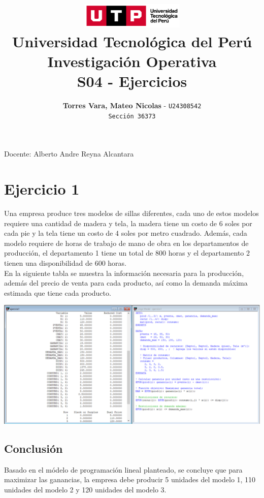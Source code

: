\documentclass[12pt]{article}
\title{
  \vspace{2cm}
  \pagenumbering{gobble}
  \includegraphics[width=5cm]{../assets/logo-utp.png} \\
  \vspace{1cm}
  \textbf{Universidad Tecnológica del Perú} \\
  \vspace{2cm}
  \textbf{Investigación Operativa} \\
  \vspace{1cm}
  \large \textbf{S04 - Ejercicios}
}
\author{
  \textbf{Torres Vara, Mateo Nicolas} - \texttt{U24308542} \\
  \texttt{Sección 36373}
}
\begin{document}
\maketitle
\begin{center}

  Docente: Alberto Andre Reyna Alcantara

\end{center}

%
%

\newpage
\section*{Ejercicio 1}
\noindent Una empresa produce tres modelos de sillas diferentes, cada uno de estos modelos requiere una cantidad de madera y tela, la madera tiene un costo de 6 soles por cada pie y la tela tiene un costo de 4 soles por metro cuadrado. Además, cada modelo requiere de horas de trabajo de mano de obra en los departamentos de producción, el departamento 1 tiene un total de 800 horas y el departamento 2 tienen una disponibilidad de 600 horas. \\
En la siguiente tabla se muestra la información necesaria para la producción, además del precio de venta para cada producto, así como la demanda máxima estimada que tiene cada producto.

\begin{center}
  \includegraphics[width=1\textwidth]{./assets/ejercicio1.PNG}
\end{center}

\subsection*{Conclusión}
\noindent Basado en el módelo de programación lineal planteado, se concluye que para maximizar las ganancias, la empresa debe producir 5 unidades del modelo 1, 110 unidades del modelo 2 y 120 unidades del modelo 3.
\end{document}
